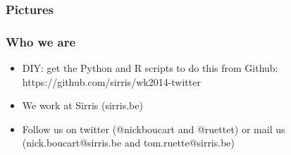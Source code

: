 \documentclass{beamer}
\begin{document}
  \begin{frame}
    \frametitle{Pictures}
    
  \end{frame}

  \begin{frame}
    \frametitle{Who we are}
    \begin{itemize}
       \item DIY: get the Python and R scripts to do this from Github: https://github.com/sirris/wk2014-twitter
       \item We work at Sirris (sirris.be)
       \item Follow us on twitter (@nickboucart and @ruettet) or mail us (nick.boucart@sirris.be and tom.ruette@sirris.be)
    \end{itemize}
  \end{frame}
 
\end{document}
